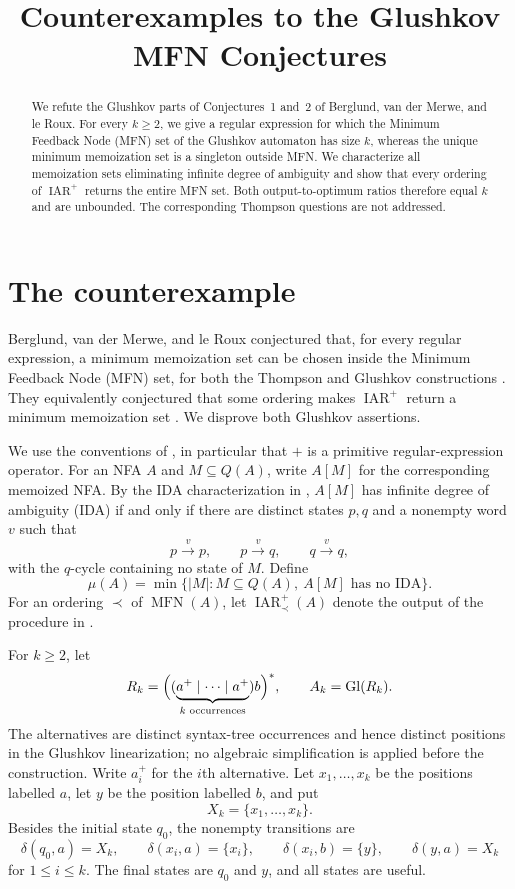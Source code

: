 \documentclass[11pt]{amsart}
\title[Glushkov MFN counterexamples]
{Counterexamples to the Glushkov MFN Conjectures}
\date{}
\newcommand{\Gl}{\operatorname{Gl}}
\newcommand{\MFN}{\operatorname{MFN}}
\newcommand{\IARp}{\operatorname{IAR}^{+}}
\begin{document}
\begin{abstract}
We refute the Glushkov parts of Conjectures~1 and~2 of Berglund,
van der Merwe, and le Roux. For every $k\ge 2$, we give a regular
expression for which the Minimum Feedback Node (MFN) set of the
Glushkov automaton has size $k$, whereas the unique minimum
memoization set is a singleton outside MFN. We characterize all
memoization sets eliminating infinite degree of ambiguity and show
that every ordering of $\IARp$ returns the entire MFN set. Both
output-to-optimum ratios therefore equal $k$ and are unbounded. The
corresponding Thompson questions are not addressed.
\end{abstract}

\maketitle

\section{The counterexample}

Berglund, van der Merwe, and le Roux conjectured that, for every
regular expression, a minimum memoization set can be chosen inside the
Minimum Feedback Node (MFN) set, for both the Thompson and Glushkov
constructions \cite[Conjecture~1]{BerglundEtAl2026}. They equivalently
conjectured that some ordering makes $\IARp$ return a minimum
memoization set
\cite[Conjecture~2 and Observation~3]{BerglundEtAl2026}.
We disprove both Glushkov assertions.

We use the conventions of \cite{BerglundEtAl2026}, in particular that
$+$ is a primitive regular-expression operator. For an NFA $A$ and
$M\subseteq Q(A)$, write $A[M]$ for the corresponding memoized NFA.
By the IDA characterization in \cite[Theorem~1]{BerglundEtAl2026},
$A[M]$ has infinite degree of ambiguity (IDA) if and only if there are
distinct states $p,q$ and a nonempty word $v$ such that
\[
p\xrightarrow{v}p,
\qquad
p\xrightarrow{v}q,
\qquad
q\xrightarrow{v}q,
\]
with the $q$-cycle containing no state of $M$. Define
\[
\mu(A)=
\min\bigl\{
  |M|:M\subseteq Q(A),\ A[M]\text{ has no IDA}
\bigr\}.
\]
For an ordering $\prec$ of $\MFN(A)$, let $\IARp_{\prec}(A)$ denote
the output of the procedure in
\cite[Definition~5]{BerglundEtAl2026}.

For $k\ge 2$, let
\[
R_k=
\Bigl(
  (\underbrace{a^+\mid\cdots\mid a^+}_{k\text{ occurrences}})b
\Bigr)^*,
\qquad
A_k=\Gl(R_k).
\]
The alternatives are distinct syntax-tree occurrences and hence
distinct positions in the Glushkov linearization; no algebraic
simplification is applied before the construction. Write $a_i^+$ for
the $i$th alternative. Let $x_1,\ldots,x_k$ be the positions labelled
$a$, let $y$ be the position labelled $b$, and put
\[
X_k=\{x_1,\ldots,x_k\}.
\]
Besides the initial state $q_0$, the nonempty transitions are
\[
\delta(q_0,a)=X_k,
\qquad
\delta(x_i,a)=\{x_i\},
\qquad
\delta(x_i,b)=\{y\},
\qquad
\delta(y,a)=X_k
\]
for $1\le i\le k$. The final states are $q_0$ and $y$, and all states
are useful.
\end{document}
